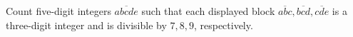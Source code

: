 Count five-digit integers $\overline{abcde}$ such that each displayed block $\overline{abc},\overline{bcd},\overline{cde}$ is a three-digit integer and is divisible by $7,8,9$, respectively.
